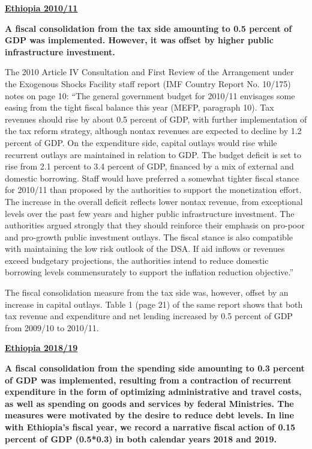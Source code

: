 \textbf{\underline{Ethiopia 2010/11}}

\textbf{A fiscal consolidation from the tax side amounting to 0.5 percent of GDP was implemented. However, it was offset by higher public infrastructure investment.} 

The 2010 Article IV Consultation and First Review of the Arrangement under the Exogenous Shocks Facility staff report (IMF Country Report No. 10/175) notes on page 10: “The general government budget for 2010/11 envisages some easing from the tight fiscal balance this year (MEFP, paragraph 10). Tax revenues should rise by about 0.5 percent of GDP, with further implementation of the tax reform strategy, although nontax revenues are expected to decline by 1.2 percent of GDP. On the expenditure side, capital outlays would rise while recurrent outlays are maintained in relation to GDP. The budget deficit is set to rise from 2.1 percent to 3.4 percent of GDP, financed by a mix of external and domestic borrowing. Staff would have preferred a somewhat tighter fiscal stance for 2010/11 than proposed by the authorities to support the monetization effort. The increase in the overall deficit reflects lower nontax revenue, from exceptional levels over the past few years and higher public infrastructure investment. The authorities argued strongly that they should reinforce their emphasis on pro-poor and pro-growth public investment outlays. The fiscal stance is also compatible with maintaining the low risk outlook of the DSA. If aid inflows or revenues exceed budgetary projections, the authorities intend to reduce domestic borrowing levels commensurately to support the inflation reduction objective.”

The fiscal consolidation measure from the tax side was, however, offset by an increase in capital outlays. Table 1 (page 21) of the same report shows that both tax revenue and expenditure and net lending increased by 0.5 percent of GDP from 2009/10 to 2010/11.

\textbf{\underline{Ethiopia 2018/19}}

\textbf{A fiscal consolidation from the spending side amounting to 0.3 percent of GDP was implemented, resulting from a contraction of recurrent expenditure in the form of optimizing administrative and travel costs, as well as spending on goods and services by federal Ministries. The measures were motivated by the desire to reduce debt levels. In line with Ethiopia’s fiscal year, we record a narrative fiscal action of 0.15 percent of GDP (0.5*0.3) in both calendar years 2018 and 2019.}

